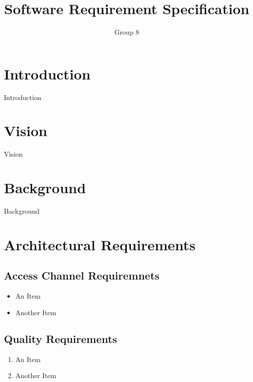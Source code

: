 \documentclass[a4paper]{article}
\begin{document}
	\title{\Huge{Software Requirement Specification}}
	\author{Group 8}
	\maketitle

	\section{Introduction}

		Introduction

	\section{Vision}

		Vision

	\section{Background}

		Background

	\section{Architectural Requirements}

		\subsection{Access Channel Requiremnets}

			\begin{itemize}

				\item{An Item}

				\item{Another Item}

			\end{itemize}

		\subsection{Quality Requirements}

			\begin{enumerate}

				\item{An Item}

				\item{Another Item}

			\end{enumerate}
\end{document}
